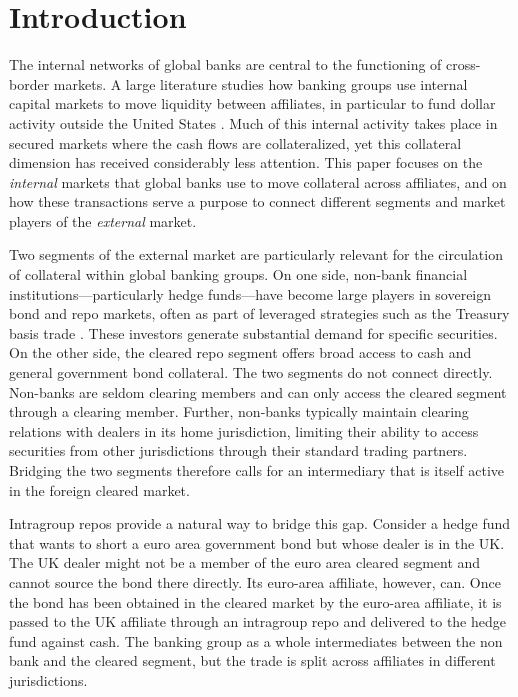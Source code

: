 \documentclass[english, 11pt, oneside, legal]{article}
\begin{document}
\setcounter{footnote}{0}
\renewcommand{\thefootnote}{\arabic{footnote}}
\setcounter{equation}{0}
\newpage 
\setlength{\parindent}{0pt}
\setlength{\parskip}{\bigskipamount}

\renewcommand{\refname}{References}
\long\def\symbolfootnote[#1]#2{\begingroup%
\def\thefootnote{\fnsymbol{footnote}}\footnote[#1]{#2}\endgroup}
\onehalfspacing


\section{Introduction}
\label{sec:intro}

The internal networks of global banks are central to the functioning of cross-border markets. A large literature studies how banking groups use internal capital markets to move liquidity between affiliates, in particular to fund dollar activity outside the United States \citep{cetorelli2012, aldasoro2022}. Much of this internal activity takes place in secured markets where the cash flows are collateralized, yet this collateral dimension has received considerably less attention. This paper focuses on the \textit{internal} markets that global banks use to move collateral across affiliates, and on how these transactions serve a purpose to connect different segments and market players of the \textit{external} market.

Two segments of the external market are particularly relevant for the circulation of collateral within global banking groups. On one side, non-bank financial institutions---particularly hedge funds---have become large players in sovereign bond and repo markets, often as part of leveraged strategies such as the Treasury basis trade \citep{barth2025, pelizzon2025, kruttli2025}. These investors generate substantial demand for specific securities. On the other side, the cleared repo segment offers broad access to cash and general government bond collateral. The two segments do not connect directly. Non-banks are seldom clearing members and can only access the cleared segment through a clearing member. Further, non-banks typically maintain clearing relations with dealers in its home jurisdiction, limiting their ability to access securities from other jurisdictions through their standard trading partners. Bridging the two segments therefore calls for an intermediary that is itself active in the foreign cleared market.

Intragroup repos provide a natural way to bridge this gap. Consider a hedge fund that wants to short a euro area government bond but whose dealer is in the UK. The UK dealer might not be a member of the euro area cleared segment and cannot source the bond there directly. Its euro-area affiliate, however, can. Once the bond has been obtained in the cleared market by the euro-area affiliate, it is passed to the UK affiliate through an intragroup repo and delivered to the hedge fund against cash. The banking group as a whole intermediates between the non bank and the cleared segment, but the trade is split across affiliates in different jurisdictions.
\end{document}
